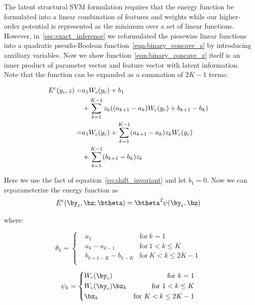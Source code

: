 \documentclass[sigconf]{acmart}
\begin{document}
The latent structural SVM formulation requires that the energy
function be formulated into a linear combination of features and
weights while our higher-order potential is represented as the
minimum over a set of linear functions. However,
in~\ref{sec:exact_inference} we reformulated the piesewise linear
functions into a quadratic pseudo-Boolean
function~\eqref{eqn:binary_concave_z} by introducing auxiliary
variables. Now we show function~\eqref{eqn:binary_concave_z}
itself is an inner product of parameter vector and feature vector
with latent information. Note that the function can be expanded
as a summation of $2K-1$ terms:

\begin{align}
  \label{eq:originalenergy}
  E^c(y_c,z)=&a_1W_c(y_c)+b_1\notag \\
            &+\sum_{k=1}^{K-1}z_k((a_{k+1}-a_k)W_c(y_c)+b_{k+1}-b_k)\notag \\ 
            =&a_1W_c(y_c)+\sum_{k=1}^{K-1}(a_{k+1}-a_k)z_kW_c(y_c) \notag \\
            &+\sum_{k=1}^{K-1}(b_{k+1}-b_k)z_k
\end{align}

Here we use the fact of equation~\eqref{eq:shift_invariant} and
let $b_1=0$. Now we can reparameterize the energy function
as
\begin{align}
  \label{eq:llsvm_innerprod_energy}
  E^c(\by_c,\bz; \btheta) = \btheta^T \! \psi(\by_c,\bz)
\end{align}

\noindent where:

\begin{equation}
\label{eq:llsvm_param}
  \theta_k = \left\{
    \begin{aligned}
      & a_1	& \text{for} \ k=1\\
      & a_k-a_{k-1} & \text{for}\ 1< k \leq K\\
      & b_{k+1-K}-b_{k-K} & \text{for} \ K<k\le2K-1\\
    \end{aligned}
  \right.
\end{equation}

\begin{equation}
\label{eq:llsvm_feature}
  \psi_k = \left\{
		\begin{aligned}
      & W_c(\by_c) 	& \text{for} \ k=1\\
      & W_c(\by_c)\bz_k & \text{for}\ 1<k\le K\\
      & \bz_k & \text{for} \ K<k\le2K-1\\
		\end{aligned}
  \right.
\end{equation}
\end{document}
